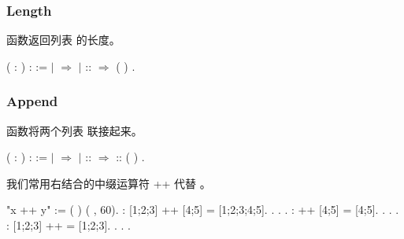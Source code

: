 \documentclass[12pt]{report}
\begin{document}
{{{\subsubsection{Length}



  函数返回列表  的长度。\begin{coqdoccode}
\coqdocemptyline
\coqdocnoindent
{}  ( : ) :  :=\coqdoceol
\coqdocindent{1.00em}
  \coqdoceol
\coqdocindent{1.00em}
\ensuremath{|}  \ensuremath{\Rightarrow} \coqdoceol
\coqdocindent{1.00em}
\ensuremath{|}  ::  \ensuremath{\Rightarrow}  ( )\coqdoceol
\coqdocindent{1.00em}
.\coqdoceol
\end{coqdoccode}
\subsubsection{Append}



  函数将两个列表   联接起来。 \begin{coqdoccode}
\coqdocemptyline
\coqdocnoindent
{}  (  : ) :  :=\coqdoceol
\coqdocindent{1.00em}
  \coqdoceol
\coqdocindent{1.00em}
\ensuremath{|}     \ensuremath{\Rightarrow} \coqdoceol
\coqdocindent{1.00em}
\ensuremath{|}  ::  \ensuremath{\Rightarrow}  :: (  )\coqdoceol
\coqdocindent{1.00em}
.\coqdoceol
\coqdocemptyline
\end{coqdoccode}
我们常用右结合的中缀运算符 ++ 代替 。\begin{coqdoccode}
\coqdocemptyline
\coqdocnoindent
{} "x ++ y" := (  )\coqdoceol
\coqdocindent{10.50em}
( ,   60).\coqdoceol
\coqdocemptyline
\coqdocnoindent
{} : [1;2;3] ++ [4;5] = [1;2;3;4;5].\coqdoceol
\coqdocnoindent
{}. . .\coqdoceol
\coqdocnoindent
{} :  ++ [4;5] = [4;5].\coqdoceol
\coqdocnoindent
{}. . .\coqdoceol
\coqdocnoindent
{} : [1;2;3] ++  = [1;2;3].\coqdoceol
\coqdocnoindent
{}. . .\coqdoceol
\end{coqdoccode}
}}}
\end{document}
